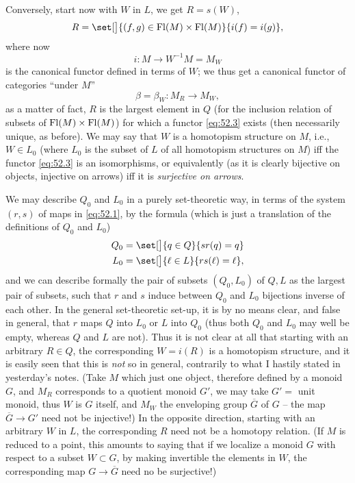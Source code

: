 Conversely, start now with $W$ in $L$, we get $R=s(W)$,
\[ R = \set[\big]{(f,g)\in\Fl(M)\times\Fl(M)}{i(f)=i(g)},\]
where now
\[ i : M\to W^{-1}M=M_W\]
is the canonical functor defined in terms of $W$; we thus get a
canonical functor of categories ``under $M$''
\begin{equation}
  \label{eq:52.3}
  \beta=\beta_W : M_R \to M_W,
  \tag{3}
\end{equation}
as a matter of fact, $R$ is the largest element in $Q$ (for the
inclusion relation of subsets of $\operatorname{Fl}(M)\times\operatorname{Fl}(M)$) for which a
functor \eqref{eq:52.3} exists (then necessarily unique, as
before). We may say that $W$ is a homotopism structure on $M$, i.e.,
$W\in L_0$ (where $L_0$ is the subset of $L$ of all homotopism
structures on $M$) if{f} the functor \eqref{eq:52.3} is an
isomorphisms, or equivalently (as it is clearly bijective on objects,
injective on arrows) if{f} it is \emph{surjective on arrows}.

We may describe $Q_0$ and $L_0$ in a purely set-theoretic way, in
terms of the system $(r,s)$ of maps in \eqref{eq:52.1}, by the formula
(which is just a translation of the definitions of $Q_0$ and $L_0$)
\begin{align*}
  Q_0 &= \set[\big]{q\in Q}{sr(q)=q} \\
  L_0 &= \set[\big]{\ell\in L}{rs(\ell)=\ell} , 
\end{align*}
and we can describe formally the pair of subsets $(Q_0,L_0)$ of $Q,L$
as the largest pair of subsets, such that $r$ and $s$ induce between
$Q_0$ and $L_0$ bijections inverse of each other. In the general
set-theoretic set-up, it is by no means clear, and false in general,
that $r$ maps $Q$ into $L_0$ or $L$ into $Q_0$ (thus both $Q_0$ and
$L_0$ may well be empty, whereas $Q$ and $L$ are not). Thus it is not
clear at all that starting with an arbitrary $R\in Q$, the
corresponding $W=i(R)$ is a homotopism structure, and it is easily
seen that this is \emph{not} so in general, contrarily to what I
hastily stated in yesterday's notes. (Take $M$ which just one object,
therefore defined by a monoid $G$, and $M_R$ corresponds to a quotient
monoid $G'$, we may take $G'=$ unit monoid, thus $W$ is $G$ itself,
and $M_W$ the enveloping group $\overline G$ of $G$ -- the map
$\overline G\to G'$ need not be injective!) In the opposite direction,
starting with an arbitrary $W$ in $L$, the corresponding $R$ need not
be a homotopy relation. (If $M$ is reduced to a point, this amounts to
saying that if we localize a monoid $G$ with respect to a subset
$W\subset G$, by making invertible the elements in $W$, the
corresponding map $G\to \overline G$ need no be surjective!)

